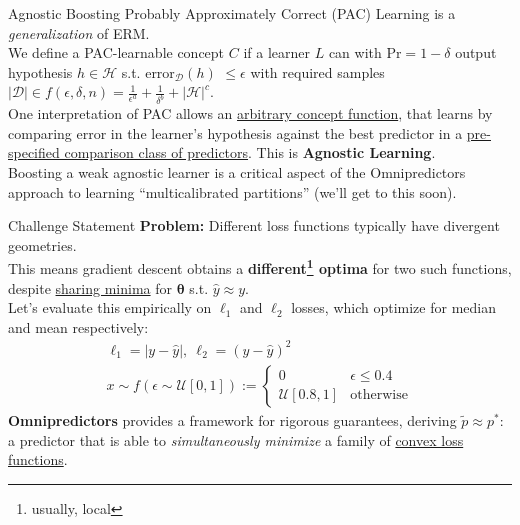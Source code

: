 \documentclass{beamer}
\begin{document}
\begin{frame}{Agnostic Boosting}
	Probably Approximately Correct (PAC) Learning is a \textit{generalization} of ERM. \pause \newline \\

	We define a PAC-learnable concept $C$ if a learner $L$ can with $\text{Pr}=1-\delta$ output hypothesis $h \in \mathcal{H}$ s.t. error${}_{\mathcal{D}}(h)$ $\leq \epsilon$ with required samples $|\mathcal{D}| \in f(\epsilon, \delta, n) = \frac{1}{\epsilon^a} + \frac{1}{\delta^b} + |\mathcal{H}|^c$. \pause \newline \\

	One interpretation of PAC allows an \underline{arbitrary concept function}, that learns by comparing error in the learner's hypothesis against the best predictor in a \underline{pre-specified comparison class of predictors}. \pause This is \textbf{Agnostic Learning}. \pause \newline \\

	Boosting a weak agnostic learner is a critical aspect of the Omnipredictors approach to learning ``multicalibrated partitions'' (we'll get to this soon).
\end{frame}

\begin{frame}{Challenge Statement}
	\textbf{Problem:} Different loss functions typically have divergent geometries. \pause \newline \\

	This means gradient descent obtains a \textbf{different\footnote{usually, local} optima} for two such functions, despite \underline{sharing minima} for $\bm{\theta}$ s.t. $\hat{y} \approx y$. \pause \newline \\

	Let's evaluate this empirically on $\ell_1$ and $\ell_2$ losses, which optimize for median and mean respectively:
	\begin{gather}
		\ell_1 = |y-\hat{y}|,~\ell_2 = (y-\hat{y})^2 \\ 
		x \sim f(\epsilon \sim \mathcal{U}[0,1]) := \begin{cases}
			0 & \epsilon \leq 0.4 \\
			\mathcal{U}[0.8, 1] & \text{otherwise}
		\end{cases}
	\end{gather} \pause
	\textbf{Omnipredictors} provides a framework for rigorous guarantees, deriving $\tilde{p} \approx p^*$: a predictor that is able to \textit{simultaneously minimize} a family of \underline{convex loss functions}.
\end{frame}
\end{document}
